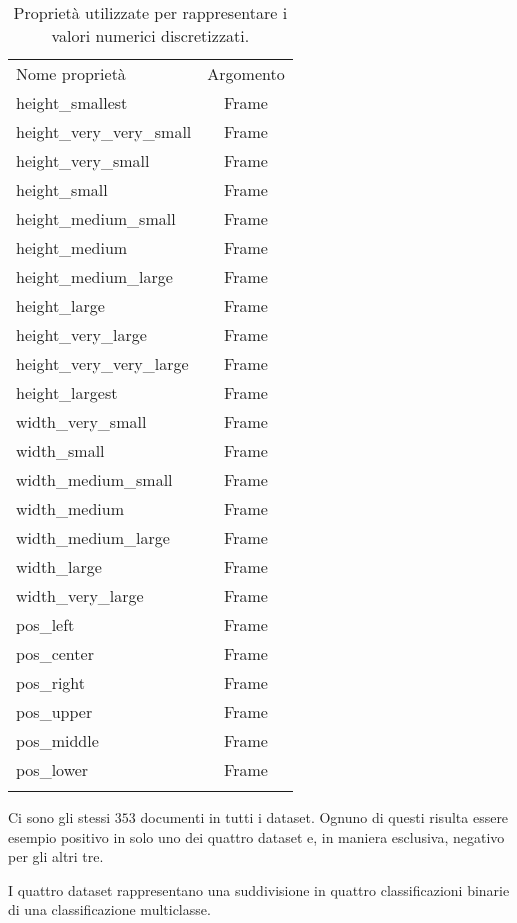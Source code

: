 \begin{table}[h!tbp]
\centering
\small\begin{tabular}{lc}
\toprule
\addlinespace
Nome proprietà & Argomento \\
\addlinespace
\midrule
\addlinespace
height\_smallest & Frame \\ 
height\_very\_very\_small & Frame \\ 
height\_very\_small & Frame \\ 
height\_small & Frame \\ 
height\_medium\_small & Frame \\ 
height\_medium & Frame \\ 
height\_medium\_large & Frame \\ 
height\_large & Frame \\ 
height\_very\_large & Frame \\ 
height\_very\_very\_large & Frame \\ 
height\_largest & Frame \\ 
\midrule
width\_very\_small & Frame \\ 
width\_small & Frame \\ 
width\_medium\_small & Frame \\ 
width\_medium & Frame \\ 
width\_medium\_large & Frame \\ 
width\_large & Frame \\ 
width\_very\_large & Frame \\ 
\midrule
pos\_left & Frame \\ 
pos\_center & Frame \\ 
pos\_right & Frame \\
\midrule
pos\_upper & Frame \\ 
pos\_middle & Frame \\ 
pos\_lower & Frame \\  
\addlinespace
\bottomrule 
\end{tabular}
\caption[Proprietà di discretizzazione]{Proprietà utilizzate per rappresentare i valori numerici discretizzati.}
\label{tab:discretizzazione}
\end{table}

Ci sono gli stessi $353$ documenti in tutti i dataset. Ognuno di questi risulta essere esempio positivo in solo uno dei quattro dataset e, in maniera esclusiva, negativo per gli altri tre.

I quattro dataset rappresentano una suddivisione in quattro classificazioni binarie di una classificazione multiclasse.



